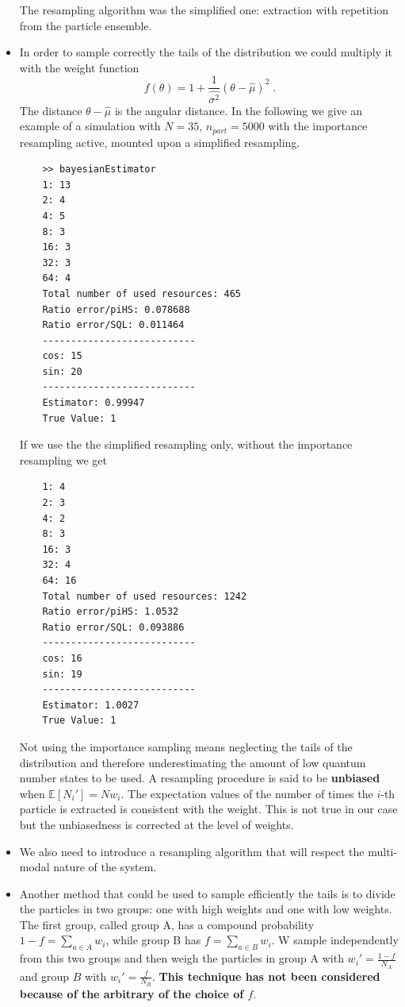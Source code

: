 \documentclass[aps, pra, 10pt, twocolumn, superscriptaddress,floatfix]{revtex4-1}
\begin{document}
\begin{itemize}
\begin{verbatim}
	\end{verbatim}
	
	The resampling algorithm was the simplified one: extraction with repetition from the particle ensemble.
	
	\item In order to sample correctly the tails of the distribution we could multiply it with the weight function
	\begin{equation}
		f(\theta) = 1 + \frac{1}{\hat{\sigma^2}} (\theta - \hat{\mu})^2 \; .
	\end{equation}
	The distance $\theta - \hat{\mu}$ is the angular distance. In the following we give an example of a simulation with $N = 35$, $n_ {part} = 5000$ with the importance resampling active, mounted upon a simplified resampling.
	
	\begin{verbatim}
	>> bayesianEstimator
	1: 13
	2: 4
	4: 5
	8: 3
	16: 3
	32: 3
	64: 4
	Total number of used resources: 465
	Ratio error/piHS: 0.078688
	Ratio error/SQL: 0.011464
	---------------------------
	cos: 15
	sin: 20
	---------------------------
	Estimator: 0.99947
	True Value: 1
	\end{verbatim}
	
	If we use the the simplified resampling only, without the importance resampling we get
	
	\begin{verbatim}
	1: 4
	2: 3
	4: 2
	8: 3
	16: 3
	32: 4
	64: 16
	Total number of used resources: 1242
	Ratio error/piHS: 1.0532
	Ratio error/SQL: 0.093886
	---------------------------
	cos: 16
	sin: 19
	---------------------------
	Estimator: 1.0027
	True Value: 1
	\end{verbatim}
	
	Not using the importance sampling means neglecting the tails of the distribution and therefore underestimating the amount of low quantum number states to be used. A resampling procedure is said to be \textbf{unbiased} when $\mathbb{E} \left[N_i'\right] = N w_i$. The expectation values of the number of times the $i$-th particle is extracted is consistent with the weight. This is not true in our case but the unbiasedness is corrected at the level of weights.
	
	\item We also need to introduce a resampling algorithm that will respect the multi-modal nature of the system.

	\item Another method that could be used to sample efficiently the tails is to divide the particles in two groups: one with high weights and one with low weights. The first group, called group A, has a compound probability $1-f = \sum_{a \in A} w_{i}$, while group B has $f = \sum_{a \in B} w_{i}$. W sample independently from this two groups and then weigh the particles in group A with $w_i' = \frac{1-f}{N_A}$ and group $B$ with $w_i' = \frac{f}{N_B}$. \textbf{This technique has not been considered because of the arbitrary of the choice of $f$}. 
	

\end{itemize}
\end{document}
